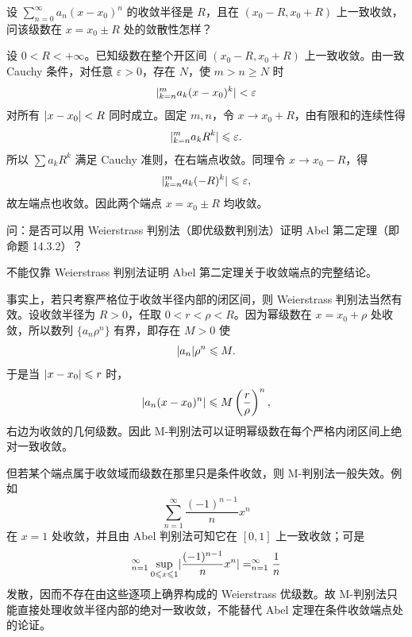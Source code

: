 \begin{xthought}[3]
设 $\displaystyle\sum_{n=0}^{\infty}a_n(x-x_0)^n$ 的收敛半径是 $R$，且在 $(x_0-R,x_0+R)$ 上一致收敛，问该级数在 $x=x_0\pm R$ 处的敛散性怎样？
\end{xthought}
\begin{xsolution}
设 $0<R<+\infty$。已知级数在整个开区间 $(x_0-R,x_0+R)$ 上一致收敛。由一致 Cauchy 条件，对任意 $\varepsilon>0$，存在 $N$，使 $m>n\geqslant N$ 时
\[
  \lvert\relax_{k=n}^{m}a_k(x-x_0)^k\rvert<\varepsilon
\]
对所有 $\lvert x-x_0\rvert<R$ 同时成立。固定 $m,n$，令 $x\to x_0+R$，由有限和的连续性得
\[
  \lvert\relax_{k=n}^{m}a_kR^k\rvert\leqslant\varepsilon.
\]
所以 $\sum a_kR^k$ 满足 Cauchy 准则，在右端点收敛。同理令 $x\to x_0-R$，得
\[
  \lvert\relax_{k=n}^{m}a_k(-R)^k\rvert\leqslant\varepsilon,
\]
故左端点也收敛。因此两个端点 $x=x_0\pm R$ 均收敛。
\end{xsolution}


\begin{xthought}[4]
问：是否可以用 Weierstrass 判别法（即优级数判别法）证明 Abel 第二定理（即命题 14.3.2）？
\end{xthought}
\begin{xsolution}
不能仅靠 Weierstrass 判别法证明 Abel 第二定理关于收敛端点的完整结论。

事实上，若只考察严格位于收敛半径内部的闭区间，则 Weierstrass 判别法当然有效。设收敛半径为 $R>0$，任取 $0<r<\rho<R$。因为幂级数在 $x=x_0+\rho$ 处收敛，所以数列 $\{a_n\rho^n\}$ 有界，即存在 $M>0$ 使
\[
  \lvert a_n\rvert\rho^n\leqslant M.
\]
于是当 $\lvert x-x_0\rvert\leqslant r$ 时，
\[
  \lvert a_n(x-x_0)^n\rvert
  \leqslant M\left(\frac r\rho\right)^n,
\]
右边为收敛的几何级数。因此 M-判别法可以证明幂级数在每个严格内闭区间上绝对一致收敛。

但若某个端点属于收敛域而级数在那里只是条件收敛，则 M-判别法一般失效。例如
\[
  \sum_{n=1}^{\infty}\frac{(-1)^{n-1}}n x^n
\]
在 $x=1$ 处收敛，并且由 Abel 判别法可知它在 $[0,1]$ 上一致收敛；可是
\[
  \relax_{n=1}^{\infty}\sup_{0\leqslant x\leqslant1}
  \lvert\frac{(-1)^{n-1}}n x^n\rvert
  =\relax_{n=1}^{\infty}\frac1n
\]
发散，因而不存在由这些逐项上确界构成的 Weierstrass 优级数。故 M-判别法只能直接处理收敛半径内部的绝对一致收敛，不能替代 Abel 定理在条件收敛端点处的论证。
\end{xsolution}


